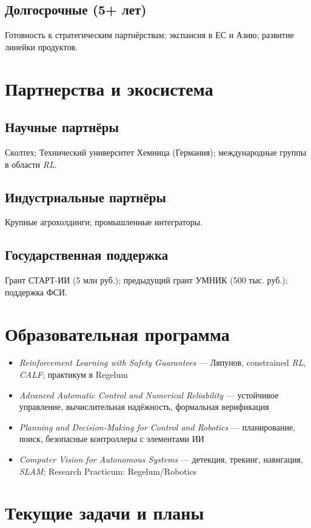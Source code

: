 \documentclass[12pt,a4paper]{article}
\begin{document}
\subsection*{Долгосрочные (5+ лет)}
Готовность к стратегическим партнёрствам; экспансия в ЕС и Азию; развитие линейки продуктов.

\section{Партнерства и экосистема}
\subsection*{Научные партнёры}
Сколтех; Технический университет Хемница (Германия); международные группы в области \textit{RL}.

\subsection*{Индустриальные партнёры}
Крупные агрохолдинги; промышленные интеграторы.

\subsection*{Государственная поддержка}
Грант СТАРТ-ИИ (5 млн руб.); предыдущий грант УМНИК (500 тыс. руб.); поддержка ФСИ.

\section{Образовательная программа}
\begin{itemize}
    \item \textit{Reinforcement Learning with Safety Guarantees} --- Ляпунов, constrained \textit{RL}, \textit{CALF}; практикум в Regelum
    \item \textit{Advanced Automatic Control and Numerical Reliability} --- устойчивое управление, вычислительная надёжность, формальная верификация
    \item \textit{Planning and Decision-Making for Control and Robotics} --- планирование, поиск, безопасные контроллеры с элементами ИИ
    \item \textit{Computer Vision for Autonomous Systems} --- детекция, трекинг, навигация, \textit{SLAM}; Research Practicum: Regelum/Robotics
\end{itemize}

\section{Текущие задачи и планы}
\end{document}
